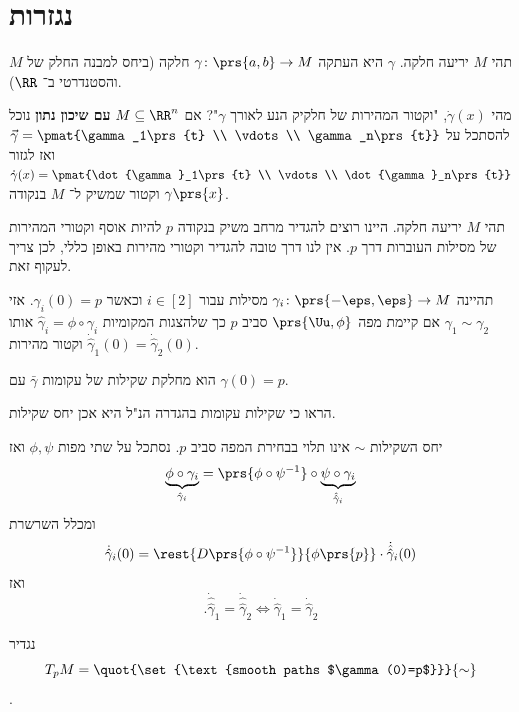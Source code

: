 \documentclass[a4paper,10pt,twoside,openany]{book}
\begin{document}
\section{נגזרות}
\begin{definition}
תהי
$M$
יריעה חלקה.
$\gamma$
היא העתקה
$\gamma \colon \prs{a,b} \to M$
חלקה (ביחס למבנה החלק של
$M$
והסטנדרטי ב־%
$\RR$).
\end{definition}
\begin{question}
מהי
$\dot{\gamma}(x)$,
"וקטור המהירות של חלקיק הנע לאורך
$\gamma$"?
אם
$M \subseteq \RR^n$
\textbf{עם שיכון נתון}
נוכל להסתכל על
$\vec{\gamma} = \pmat{\gamma_1\prs{t} \\ \vdots \\ \gamma_n\prs{t}}$
ואז לגזור
$\dot{\gamma}(x) = \pmat{\dot{\gamma}_1\prs{t} \\ \vdots \\ \dot{\gamma}_n\prs{t}}$
וקטור שמשיק ל־%
$M$
בנקודה
$\gamma\prs{x}$.
\end{question}
\begin{remark}
תהי
$M$
יריעה חלקה.
היינו רוצים להגדיר מרחב משיק בנקודה
$p$
להיות אוסף וקטורי המהירות של מסילות העוברות דרך
$p$.
אין לנו דרך טובה להגדיר וקטורי מהירות באופן כללי, לכן צריך לעקוף זאת.
\end{remark}
\begin{definition}
תהיינה
$\gamma_i \colon \prs{-\eps, \eps} \to M$
מסילות עבור
$i \in [2]$
וכאשר
$\gamma_i(0) = p$.
אזי
$\gamma_1 \sim \gamma_2$
אם קיימת מפה
$\prs{\Uu, \phi}$
סביב
$p$
כך שלהצגות המקומיות
$\hat{\gamma}_i = \phi \circ \gamma_i$
אותו וקטור מהירות
$\dot{\hat{\gamma}}_1(0) = \dot{\hat{\gamma}}_2(0)$.
\end{definition}
\begin{definition}
הוא מחלקת שקילות של עקומות
$\bar{\gamma}$
עם
$\gamma(0) = p$.
\end{definition}
\begin{exercise}
הראו כי שקילות עקומות בהגדרה הנ"ל היא אכן יחס שקילות.
\end{exercise}
\begin{remark}
יחס השקילות
$\sim$
אינו תלוי בבחירת המפה סביב
$p$.
נסתכל על שתי מפות
$\phi, \psi$
ואז
\[\underset{\hat{\gamma}_i}{\underbrace{\phi \circ \gamma_i}} = \prs{\phi \circ \psi^{-1}} \circ \underset{\hat{\hat{\gamma}}_i}{\underbrace{\psi \circ \gamma_i}}\]
ומכלל השרשרת
\[\dot{{\hat{\gamma}}}_i(0) = \rest{D\prs{\phi \circ \psi^{-1}}}{\phi\prs{p}} \cdot \dot{{\hat{\hat{\gamma}}}}_i(0)\]
ואז
\[\text{.} \dot{\hat{\hat{\gamma}}}_1 = \dot{\hat{\hat{\gamma}}}_2 \iff \dot{{\hat{\gamma}}}_1 = \dot{\hat{{\gamma}}}_2\]
\end{remark}
\begin{definition}
נגדיר
\[T_p M = \quot{\set{\text{smooth paths $\gamma(0)=p$}}}{\sim}\]
.
\end{definition}
\end{document}
